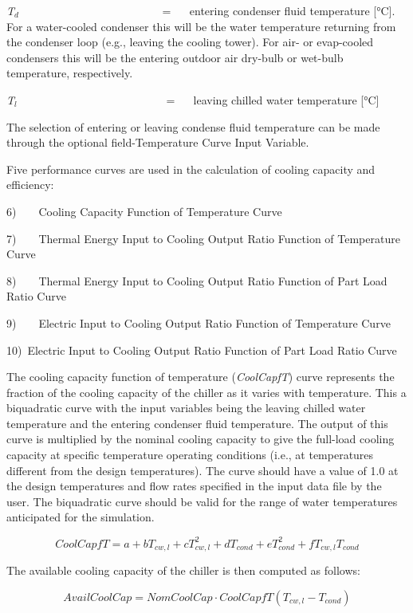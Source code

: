\emph{T\(_{d}\)}~~~~~~~~~~~~~~~~~~~~~~~~~ = ~~ entering condenser fluid temperature {[}°C{]}. For a water-cooled condenser this will be the water temperature returning from the condenser loop (e.g., leaving the cooling tower). For air- or evap-cooled condensers this will be the entering outdoor air dry-bulb or wet-bulb temperature, respectively.

\emph{T\(_{l}\)}~~~~~~~~~~~~~~~~~~~~~~~~~~ = ~~ leaving chilled water temperature {[}°C{]}

The selection of entering or leaving condense fluid temperature can be made through the optional field-Temperature Curve Input Variable.

Five performance curves are used in the calculation of cooling capacity and efficiency:

6)~~~~Cooling Capacity Function of Temperature Curve

7)~~~~Thermal Energy Input to Cooling Output Ratio Function of Temperature Curve

8)~~~~Thermal Energy Input to Cooling Output Ratio Function of Part Load Ratio Curve

9)~~~~Electric Input to Cooling Output Ratio Function of Temperature Curve

10)~Electric Input to Cooling Output Ratio Function of Part Load Ratio Curve

The cooling capacity function of temperature (\emph{CoolCapfT}) curve represents the fraction of the cooling capacity of the chiller as it varies with temperature. This a biquadratic curve with the input variables being the leaving chilled water temperature and the entering condenser fluid temperature. The output of this curve is multiplied by the nominal cooling capacity to give the full-load cooling capacity at specific temperature operating conditions (i.e., at temperatures different from the design temperatures). The curve should have a value of 1.0 at the design temperatures and flow rates specified in the input data file by the user. The biquadratic curve should be valid for the range of water temperatures anticipated for the simulation.

\begin{equation}
CoolCapfT = a + b{T_{cw,l}} + cT_{cw,l}^2 + d{T_{cond}} + eT_{cond}^2 + f{T_{cw,l}}{T_{cond}}
\end{equation}

The available cooling capacity of the chiller is then computed as follows:

\begin{equation}
AvailCoolCap = NomCoolCap \cdot CoolCapfT({T_{cw,l}} - {T_{cond}})
\end{equation}


